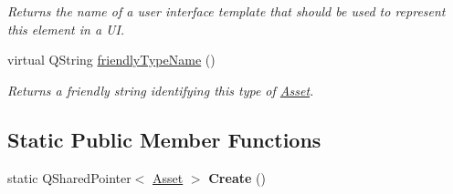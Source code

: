 \begin{DoxyCompactItemize}
\begin{DoxyCompactList}\small\item\em Returns the name of a user interface template that should be used to represent this element in a U\-I. \end{DoxyCompactList}\item 
virtual Q\-String \hyperlink{class_picto_1_1_analysis_definition_a5c70a91ca75af47092a71709c8189c39}{friendly\-Type\-Name} ()
\begin{DoxyCompactList}\small\item\em Returns a friendly string identifying this type of \hyperlink{class_picto_1_1_asset}{Asset}. \end{DoxyCompactList}\end{DoxyCompactItemize}
\subsection*{Static Public Member Functions}
\begin{DoxyCompactItemize}
\item 
\hypertarget{class_picto_1_1_analysis_definition_ac1fa26c5c3ef4dea4e3f2b69d13985b3}{static Q\-Shared\-Pointer$<$ \hyperlink{class_picto_1_1_asset}{Asset} $>$ {\bfseries Create} ()}\label{class_picto_1_1_analysis_definition_ac1fa26c5c3ef4dea4e3f2b69d13985b3}

\end{DoxyCompactItemize}
